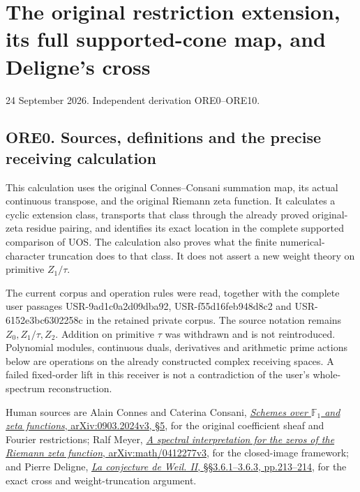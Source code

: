 \section{The original restriction extension, its full supported-cone
map, and Deligne's
cross}\label{the-original-restriction-extension-its-full-supported-cone-map-and-delignes-cross}

24 September 2026. Independent derivation ORE0--ORE10.

\subsection{ORE0. Sources, definitions and the precise receiving
calculation}\label{ore0.-sources-definitions-and-the-precise-receiving-calculation}

This calculation uses the original Connes--Consani summation map, its
actual continuous transpose, and the original Riemann zeta function. It
calculates a cyclic extension class, transports that class through the
already proved original-zeta residue pairing, and identifies its exact
location in the complete supported comparison of UOS. The calculation
also proves what the finite numerical-character truncation does to that
class. It does not assert a new weight theory on primitive \(Z_1/\tau\).

The current {corpus and operation
rules} were read, together with the complete user passages
USR-9ad1c0a2d09dba92, USR-f55d16feb948d8c2 and USR-6152e3bc6302258c in
the retained private corpus. The source notation remains
\(Z_0,Z_1/\tau,Z_2\). Addition on primitive \(\tau\) was withdrawn and
is not reintroduced. Polynomial modules, continuous duals, derivatives
and arithmetic prime actions below are operations on the already
constructed complex receiving spaces. A failed fixed-order lift in this
receiver is not a contradiction of the user's whole-spectrum
reconstruction.

Human sources are Alain Connes and Caterina Consani,
\href{https://arxiv.org/abs/0903.2024v3}{\emph{Schemes over
\(\mathbb F_1\) and zeta functions}, arXiv:0903.2024v3, §5}, for the
original coefficient sheaf and Fourier restrictions; Ralf Meyer,
\href{https://arxiv.org/abs/math/0412277v3}{\emph{A spectral
interpretation for the zeros of the Riemann zeta function},
arXiv:math/0412277v3}, for the closed-image framework; and Pierre
Deligne,
\href{https://www.numdam.org/item/PMIHES_1980__52__137_0/}{\emph{La
conjecture de Weil. II}, §§3.6.1--3.6.3, pp.213--214}, for the exact
cross and weight-truncation argument.

